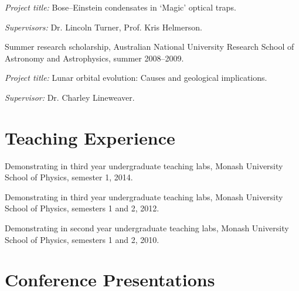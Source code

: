 \documentclass[10pt,letterpaper]{article}
\renewenvironment{itemize}{
  \begin{list}{}{
    \setlength{\leftmargin}{1.5em}
    \setlength{\itemsep}{0.25em}
    \setlength{\parskip}{0pt}
    \setlength{\parsep}{0.25em}
  }
}{
  \end{list}
}
\begin{document}
\begin{itemize}
\begin{itemize}
      \item \textit{Project title:}
      Bose--Einstein condensates in `Magic' optical traps.
      \item\textit{Supervisors:}
      Dr. Lincoln Turner, Prof. Kris Helmerson.
    \end{itemize}    
\item Summer research scholarship, Australian National University Research School of Astronomy and Astrophysics, summer 2008--2009.
    \begin{itemize}
      \item \textit{Project title:}
      Lunar orbital evolution: Causes and geological implications.
      \item\textit{Supervisor:}
      Dr. Charley Lineweaver.
    \end{itemize}

\end{itemize}


\section*{Teaching Experience}

\begin{itemize}
\item Demonstrating in third year undergraduate teaching labs, Monash University School of Physics, semester 1, 2014.
\item Demonstrating in third year undergraduate teaching labs, Monash University School of Physics, semesters 1 and 2, 2012.
\item Demonstrating in second year undergraduate teaching labs, Monash University School of Physics, semesters 1 and 2, 2010.
\end{itemize}

\section*{Conference Presentations}
\end{document}
